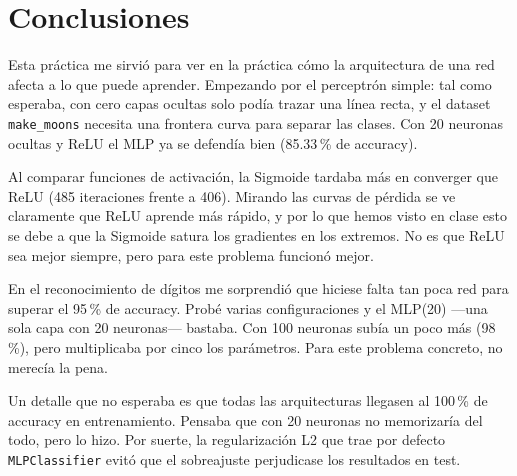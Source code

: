 \documentclass[../../__memoria.tex]{subfiles}
\begin{document}
\section*{Conclusiones}

Esta práctica me sirvió para ver en la práctica cómo la arquitectura de una red afecta a lo que puede aprender. Empezando por el perceptrón simple: tal como esperaba, con cero capas ocultas solo podía trazar una línea recta, y el dataset \texttt{make\_moons} necesita una frontera curva para separar las clases. Con 20 neuronas ocultas y ReLU el MLP ya se defendía bien (85.33\,\% de accuracy).

Al comparar funciones de activación, la Sigmoide tardaba más en converger que ReLU (485 iteraciones frente a 406). Mirando las curvas de pérdida se ve claramente que ReLU aprende más rápido, y por lo que hemos visto en clase esto se debe a que la Sigmoide satura los gradientes en los extremos. No es que ReLU sea mejor siempre, pero para este problema funcionó mejor.

En el reconocimiento de dígitos me sorprendió que hiciese falta tan poca red para superar el 95\,\% de accuracy. Probé varias configuraciones y el MLP(20) —una sola capa con 20 neuronas— bastaba. Con 100 neuronas subía un poco más (98\,\%), pero multiplicaba por cinco los parámetros. Para este problema concreto, no merecía la pena.

Un detalle que no esperaba es que todas las arquitecturas llegasen al 100\,\% de accuracy en entrenamiento. Pensaba que con 20 neuronas no memorizaría del todo, pero lo hizo. Por suerte, la regularización L2 que trae por defecto \texttt{MLPClassifier} evitó que el sobreajuste perjudicase los resultados en test.

\vspace{1.0cm}
\end{document}
